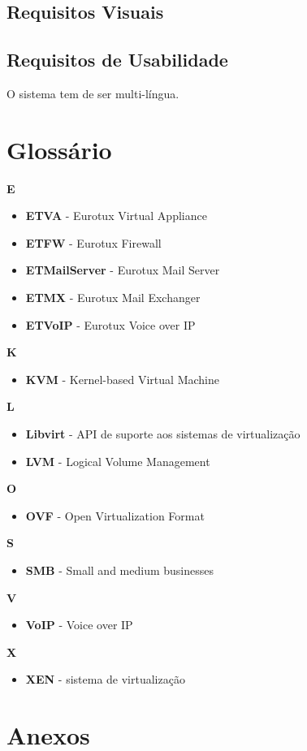 \documentclass[a4paper,11pt,titlepage]{article}
\begin{document}
\subsection{Requisitos Visuais}
\subsection{Requisitos de Usabilidade}
O sistema tem de ser multi-língua.

\section{Glossário}

{\Large \textbf{E}}

\begin{itemize}
\item \textbf{ETVA} - Eurotux Virtual Appliance
\item \textbf{ETFW} - Eurotux Firewall
\item \textbf{ETMailServer} - Eurotux Mail Server
\item \textbf{ETMX} - Eurotux Mail Exchanger
\item \textbf{ETVoIP} - Eurotux Voice over IP
\end{itemize}

{\Large \textbf{K}}

\begin{itemize}
\item \textbf{KVM} - Kernel-based Virtual Machine
\end{itemize}

{\Large \textbf{L}}

\begin{itemize}
\item \textbf{Libvirt} - API de suporte aos sistemas de virtualização
\item \textbf{LVM} - Logical Volume Management
\end{itemize}

{\Large \textbf{O}}

\begin{itemize}
\item \textbf{OVF} - Open Virtualization Format
\end{itemize}

{\Large \textbf{S}}

\begin{itemize}
\item \textbf{SMB} - Small and medium businesses
\end{itemize}

{\Large \textbf{V}}

\begin{itemize}
\item \textbf{VoIP} - Voice over IP
\end{itemize}

{\Large \textbf{X}}

\begin{itemize}
\item \textbf{XEN} - sistema de virtualização
\end{itemize}

\section{Anexos}
\end{document}
